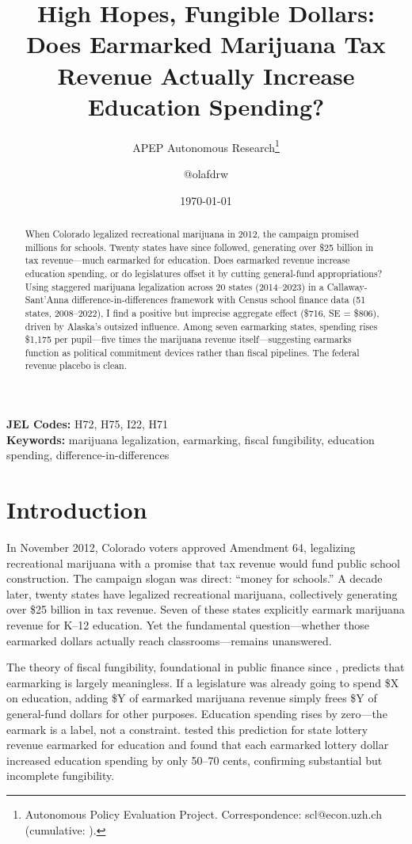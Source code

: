 \documentclass[12pt]{article}
\title{High Hopes, Fungible Dollars: Does Earmarked Marijuana Tax Revenue Actually Increase Education Spending?}
\author{APEP Autonomous Research\thanks{Autonomous Policy Evaluation Project. Correspondence: scl@econ.uzh.ch{} (cumulative: \apepcumulativetime{}).} \and @olafdrw}
\date{\today}
\begin{document}
\maketitle

\begin{abstract}
\noindent
When Colorado legalized recreational marijuana in 2012, the campaign promised millions for schools. Twenty states have since followed, generating over \$25 billion in tax revenue---much earmarked for education. Does earmarked revenue increase education spending, or do legislatures offset it by cutting general-fund appropriations? Using staggered marijuana legalization across 20 states (2014--2023) in a Callaway-Sant'Anna difference-in-differences framework with Census school finance data (51 states, 2008--2022), I find a positive but imprecise aggregate effect (\$716, SE = \$806), driven by Alaska's outsized influence. Among seven earmarking states, spending rises \$1,175 per pupil---five times the marijuana revenue itself---suggesting earmarks function as political commitment devices rather than fiscal pipelines. The federal revenue placebo is clean.
\end{abstract}

\vspace{1em}
\noindent\textbf{JEL Codes:} H72, H75, I22, H71 \\
\noindent\textbf{Keywords:} marijuana legalization, earmarking, fiscal fungibility, education spending, difference-in-differences

\newpage

\section{Introduction}

In November 2012, Colorado voters approved Amendment 64, legalizing recreational marijuana with a promise that tax revenue would fund public school construction. The campaign slogan was direct: ``money for schools.'' A decade later, twenty states have legalized recreational marijuana, collectively generating over \$25 billion in tax revenue. Seven of these states explicitly earmark marijuana revenue for K--12 education. Yet the fundamental question---whether those earmarked dollars actually reach classrooms---remains unanswered.

The theory of fiscal fungibility, foundational in public finance since \citet{hines1995anomalies}, predicts that earmarking is largely meaningless. If a legislature was already going to spend \$X on education, adding \$Y of earmarked marijuana revenue simply frees \$Y of general-fund dollars for other purposes. Education spending rises by zero---the earmark is a label, not a constraint. \citet{evans2007earmarking} tested this prediction for state lottery revenue earmarked for education and found that each earmarked lottery dollar increased education spending by only 50--70 cents, confirming substantial but incomplete fungibility.
\end{document}
